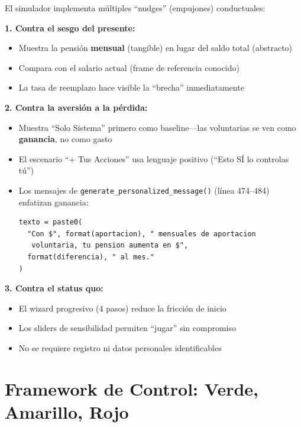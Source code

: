 \documentclass[11pt,a4paper]{report}
\begin{document}
\begin{tcolorbox}[colback=orange!5!white, colframe=orange!75!black, title=\textbf{Aplicaci\'on en C\'odigo: Nudges Impl\'icitos en el Dise\~no}, breakable]
El simulador implementa m\'ultiples ``nudges'' (empujones) conductuales:

\textbf{1. Contra el sesgo del presente:}
\begin{itemize}
  \item Muestra la pensi\'on \textbf{mensual} (tangible) en lugar del saldo total (abstracto)
  \item Compara con el salario actual (frame de referencia conocido)
  \item La tasa de reemplazo hace visible la ``brecha'' inmediatamente
\end{itemize}

\textbf{2. Contra la aversi\'on a la p\'erdida:}
\begin{itemize}
  \item Muestra ``Solo Sistema'' primero como baseline---las voluntarias se ven como \textbf{ganancia}, no como gasto
  \item El escenario ``+ Tus Acciones'' usa lenguaje positivo (``Esto S\'I lo controlas t\'u'')
  \item Los mensajes de \texttt{generate\_personalized\_message()} (l\'inea 474--484) enfatizan ganancia:
\begin{lstlisting}
texto = paste0(
  "Con $", format(aportacion), " mensuales de aportacion
   voluntaria, tu pension aumenta en $",
  format(diferencia), " al mes."
)
\end{lstlisting}
\end{itemize}

\textbf{3. Contra el status quo:}
\begin{itemize}
  \item El wizard progresivo (4 pasos) reduce la fricci\'on de inicio
  \item Los sliders de sensibilidad permiten ``jugar'' sin compromiso
  \item No se requiere registro ni datos personales identificables
\end{itemize}
\end{tcolorbox}


\section{Framework de Control: Verde, Amarillo, Rojo}
\end{document}
